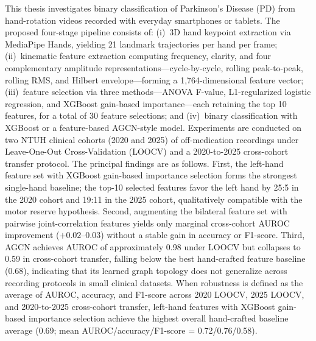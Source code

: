 \begin{abstract*}
\setlength{\parskip}{4pt}

This thesis investigates binary classification of Parkinson's Disease (PD) from hand-rotation videos recorded with everyday smartphones or tablets. The proposed four-stage pipeline consists of: (i)~3D hand keypoint extraction via MediaPipe Hands, yielding 21 landmark trajectories per hand per frame; (ii)~kinematic feature extraction computing frequency, clarity, and four complementary amplitude representations---cycle-by-cycle, rolling peak-to-peak, rolling RMS, and Hilbert envelope---forming a 1,764-dimensional feature vector; (iii)~feature selection via three methods---ANOVA F-value, L1-regularized logistic regression, and XGBoost gain-based importance---each retaining the top 10 features, for a total of 30 feature selections; and (iv)~binary classification with XGBoost or a feature-based AGCN-style model. Experiments are conducted on two NTUH clinical cohorts (2020 and 2025) of off-medication recordings under Leave-One-Out Cross-Validation (LOOCV) and a 2020-to-2025 cross-cohort transfer protocol. The principal findings are as follows. First, the left-hand feature set with XGBoost gain-based importance selection forms the strongest single-hand baseline; the top-10 selected features favor the left hand by 25:5 in the 2020 cohort and 19:11 in the 2025 cohort, qualitatively compatible with the motor reserve hypothesis. Second, augmenting the bilateral feature set with pairwise joint-correlation features yields only marginal cross-cohort AUROC improvement ($+0.02$--$0.03$) without a stable gain in accuracy or F1-score. Third, AGCN achieves AUROC of approximately 0.98 under LOOCV but collapses to 0.59 in cross-cohort transfer, falling below the best hand-crafted feature baseline (0.68), indicating that its learned graph topology does not generalize across recording protocols in small clinical datasets. When robustness is defined as the average of AUROC, accuracy, and F1-score across 2020 LOOCV, 2025 LOOCV, and 2020-to-2025 cross-cohort transfer, left-hand features with XGBoost gain-based importance selection achieve the highest overall hand-crafted baseline average (0.69; mean AUROC/accuracy/F1-score = 0.72/0.76/0.58).

\end{abstract*}
